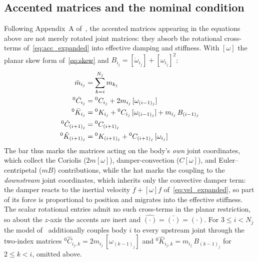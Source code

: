 \subsection{Accented matrices and the nominal condition}

Following Appendix~A of~\cite{Al-Rawashdeh2022_Caracterization}, the accented matrices appearing in the equations above are not merely rotated joint matrices: they absorb the rotational cross-terms of~\eqref{eq:acc_expanded} into effective damping and stiffness. With $[\omega]$ the planar skew form of~\eqref{eq:skew} and $B_{i_j} = [\dot{\omega}_{i_j}] + [\omega_{i_j}]^2$:
\begin{align}
    \bar{m}_{i_j} &= \sum_{k=i}^{N_j} m_{k_j} \notag \\
    {}^0\bar{C}_{i_j} &= {}^0C_{i_j} + 2m_{i_j}\,[\omega_{(i-1)_j}] \notag \\
    {}^0\bar{K}_{i_j} &= {}^0K_{i_j} + {}^0C_{i_j}\,[\omega_{(i-1)_j}] + m_{i_j}\,B_{(i-1)_j} \label{eq:accented} \\
    {}^0\hat{C}_{(i+1)_j} &= {}^0C_{(i+1)_j} \notag \\
    {}^0\hat{K}_{(i+1)_j} &= {}^0K_{(i+1)_j} + {}^0C_{(i+1)_j}\,[\omega_{i_j}] \notag
\end{align}
The bar thus marks the matrices acting on the body's \emph{own} joint coordinates, which collect the Coriolis ($2m[\omega]$), damper-convection ($C[\omega]$), and Euler--centripetal ($mB$) contributions, while the hat marks the coupling to the \emph{downstream} joint coordinates, which inherits only the convective damper term: the damper reacts to the inertial velocity $\dot{f} + [\omega]f$ of~\eqref{eq:vel_expanded}, so part of its force is proportional to position and migrates into the effective stiffness. The scalar rotational entries admit no such cross-terms in the planar restriction, so about the $z$-axis the accents are inert and $\hat{(\cdot)} = \bar{(\cdot)} = (\cdot)$. For $3 \leq i < N_j$ the model of~\cite{Al-Rawashdeh2022_Caracterization} additionally couples body $i$ to every upstream joint through the two-index matrices ${}^0\hat{C}_{i_j,k} = 2m_{i_j}\,[\omega_{(k-1)_j}]$ and ${}^0\hat{K}_{i_j,k} = m_{i_j}\,B_{(k-1)_j}$ for $2 \leq k < i$, omitted above.

